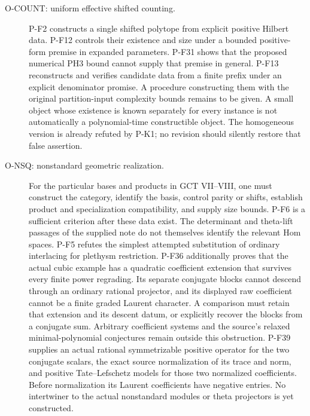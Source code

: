 \documentclass[11pt,a4paper]{article}
\begin{document}
\begin{description}
\item[O-COUNT: uniform effective shifted counting.]
P-F2 constructs a single shifted polytope from explicit positive Hilbert
data. P-F12 controls their existence and size under a bounded
positive-form premise in expanded parameters. P-F31 shows that the
proposed numerical PH3 bound cannot supply that premise in general. P-F13 reconstructs
and verifies candidate data from a finite prefix under an explicit
denominator promise. A procedure constructing them with the original
partition-input complexity bounds remains to be given. A small object
whose existence is known separately for every instance is not automatically
a polynomial-time constructible object. The homogeneous version is already
refuted by P-K1; no revision should silently restore that false assertion.

\item[O-NSQ: nonstandard geometric realization.]
For the particular bases and products in GCT VII--VIII, one must construct
the category, identify the basis, control parity or shifts, establish
product and specialization compatibility, and supply size bounds.
P-F6 is a sufficient criterion after these data exist. The determinant
and theta-lift passages of the supplied note do not themselves identify
the relevant Hom spaces. P-F5 refutes the simplest attempted substitution
of ordinary interlacing for plethysm restriction.
P-F36 additionally proves that the actual cubic example has a
quadratic coefficient extension that survives every finite power
regrading. Its separate conjugate blocks cannot descend through
an ordinary rational projector, and its displayed raw coefficient
cannot be a finite graded Laurent character. A comparison must
retain that extension and its descent datum, or explicitly recover
the blocks from a conjugate sum. Arbitrary coefficient systems
and the source's relaxed minimal-polynomial conjectures remain
outside this obstruction.
P-F39 supplies an actual rational symmetrizable positive operator
for the two conjugate scalars, the exact source normalization of
its trace and norm, and positive Tate--Lefschetz models for those
two normalized coefficients. Before normalization its Laurent
coefficients have negative entries. No intertwiner to the actual
nonstandard modules or theta projectors is yet constructed.


\end{description}
\end{document}

